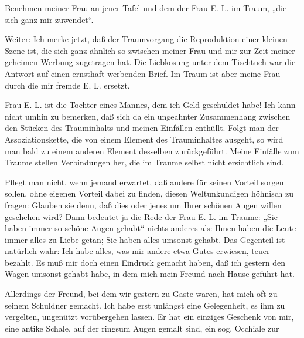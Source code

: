 \documentclass[twoside=true,titlepage=false,open=any, parskip=never, fontsize=10pt, headings=small, chapterprefix=false, appendixprefix=false]{scrbook}
\begin{document}
        \pstart
        Benehmen meiner Frau an jener Tafel und dem der Frau E. L. im Traum,
                  „die sich ganz mir zuwendet“.
        \pend
    
            
        \pstart
        Weiter: Ich merke jetzt, daß der Traumvorgang die Reproduktion einer
               kleinen Szene ist, die sich ganz ähnlich so zwischen meiner Frau und mir zur
               Zeit meiner geheimen Werbung zugetragen hat. Die Liebkosung unter dem
               Tischtuch war die Antwort auf einen ernsthaft werbenden Brief. Im
               Traum ist aber meine Frau durch die mir fremde E. L. ersetzt.
        \pend
    
            
        \pstart
        Frau E. L. ist die Tochter eines Mannes, dem ich Geld
                  geschuldet habe! Ich kann nicht umhin zu bemerken, daß sich da ein
               ungeahnter Zusammenhang zwischen den Stücken des Trauminhalts und meinen
               Einfällen enthüllt. Folgt man der Assoziationskette, die von einem Element des
               Trauminhaltes ausgeht, so wird man bald zu einem anderen Element
               desselben zurückgeführt. Meine Einfälle zum Traume stellen Verbindungen
               her, die im Traume selbst nicht ersichtlich sind.
        \pend
    
            
        \pstart
        Pflegt man nicht, wenn jemand erwartet, daß andere für seinen Vorteil sorgen
               sollen, ohne eigenen Vorteil dabei zu finden, diesen Weltunkundigen höhnisch zu
               fragen: Glauben sie denn, daß dies oder jenes um
                  Ihrer schönen Augen willen geschehen wird? Dann bedeutet ja die Rede der
               Frau E. L. im Traume: „Sie haben immer so schöne Augen gehabt“ nichts anderes
               als: Ihnen haben die Leute immer alles zu Liebe getan; Sie haben alles umsonst gehabt. Das Gegenteil ist natürlich wahr:
               Ich habe alles, was mir andere etwa Gutes erwiesen, teuer bezahlt. Es muß
               mir doch einen Eindruck gemacht haben, daß ich gestern den Wagen umsonst gehabt habe, in dem mich mein Freund nach
               Hause geführt hat.
        \pend
    
            
        \pstart
        Allerdings der Freund, bei dem wir gestern zu Gaste waren, hat mich oft zu
               seinem Schuldner gemacht. Ich habe erst unlängst eine Gelegenheit, es ihm zu
               vergelten, ungenützt vorübergehen lassen. Er hat ein einziges Geschenk von mir,
               eine antike Schale, auf der ringsum Augen gemalt
               sind, ein sog. Occhiale zur
        \pend
    
\end{document}
